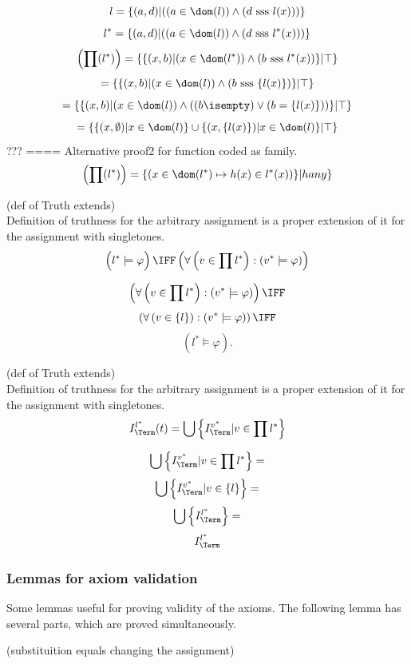 \[
l=\{(a,d)|((a\in\dom(l))\land (d \mbox{ sss } l(x)))\}
\]
\[
l^*=\{(a,d)|((a\in\dom(l))\land (d \mbox{ sss } l^*(x)))\}
\]
\[
\left(\prod (l^*)\right)=
\{\{(x,b)|(x\in \dom(l^*)) \land (b \mbox{ sss } l^*(x))\}|\top\}
\]
\[
=\{\{(x,b)|(x\in \dom(l)) \land (b \mbox{ sss } \{l(x)\})\}|\top\}
\]
\[
=\{\{(x,b)|(x\in \dom(l)) \land ((b\isempty)\lor(b=\{l(x)\}))\}|\top\}
\]
\[
=\{\{(x,\emptyset)|x\in\dom(l)\}\cup\{(x,\{l(x)\})|x\in\dom(l)\}|\top\}
\]
???
==== Alternative proof2 for function coded as family.
\[
\left(\prod (l^*)\right)=
\{(x\in \dom(l^*) \mapsto h(x) \in l^*(x))\}| h any\}
\]
\fi
\Done
\begin{theorem}(def of Truth extends)\\
Definition of truthness for the arbitrary assignment is a proper extension of it for the assignment with singletones.
\[
\left(l^*\models\varphi\vphantom\prod\right)\IFF
\left(\forall \left(v\in\prod l^*\right):
\left(v^*\models\varphi\right)\right)
\]
\end{theorem}
\Proof
\[
\left(\forall \left(v\in\prod l^*\right):
\left(v^*\models\varphi\right)\right)\IFF
\]
\[
\left(\forall \left(v\in\{l\}\right):
\left(v^*\models\varphi\right)\right)\IFF
\]
\[
\left(l^*\models\varphi\right).
\]
\Done
\begin{theorem}(def of Truth extends)\\
Definition of truthness for the arbitrary assignment is a proper extension of it for the assignment with singletones.
\[
I^{l^*}_\Term(t)=
\bigcup \left\{ I^{v^*}_\Term 
|v\in\prod l^*\right\}
\]
\end{theorem}
\Proof
\[
\bigcup \left\{ I^{v^*}_\Term 
|v\in\prod l^*\right\}=
\]
\[
\bigcup \left\{ I^{v^*}_\Term 
|v\in\{l\}\right\}=
\]
\[
\bigcup \left\{ I^{l^*}_\Term\right\}=
\]
\[
I^{l^*}_\Term
\]
\Done

\subsubsection{Lemmas for axiom validation}
Some lemmas useful for proving validity of the axioms. The following lemma has several parts, which are proved simultaneously.\\
\begin{lemma}(substituition equals changing the assignment)
\end{lemma}
